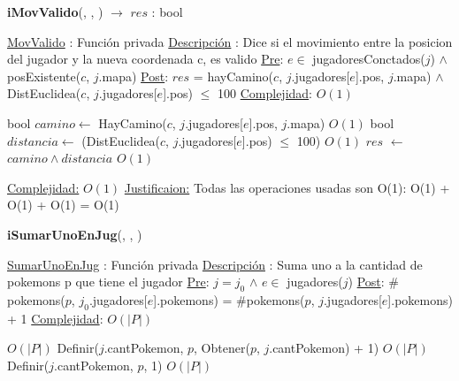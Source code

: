 \begin{Algoritmos}
\begin{algorithm}[H]
\begin{algorithmic}[1]
\end{algorithmic}
\end{algorithm}  
  


\begin{algorithm}[H]
{\textbf{iMovValido}(, , ) $\to$ $res$ : bool}
\begin{algorithmic}[1]

\Statex \underline{MovValido} : Funci\'on privada 
\Statex \underline{Descripci\'on} : Dice si el movimiento entre la posicion del jugador y la nueva coordenada c, es valido 
\Statex \underline{Pre}: $e \in$ jugadoresConctados($j$) $\land$ posExistente($c$, $j$.mapa) 
\Statex \underline{Post}: $res$ = hayCamino($c$, $j$.jugadores[$e$].pos, $j$.mapa) $\land$ 
\Statex $ $\hspace*{2cm} DistEuclidea($c$, $j$.jugadores[$e$].pos) $\leq$ 100
\Statex \underline{Complejidad}: $O(1)$ 

\State bool $camino \gets$ HayCamino($c$, $j$.jugadores[$e$].pos, $j$.mapa) \Comment $O(1)$
\State bool $distancia \gets$ (DistEuclidea($c$, $j$.jugadores[$e$].pos) $\leq$ 100) \Comment $O(1)$
\State $res$ $\gets$ $camino \land distancia$ \Comment $O(1)$

\medskip
\Statex \underline{Complejidad:} $O(1)$
\Statex \underline{Justificaion:} Todas las operaciones usadas son O(1): O(1) + O(1) + O(1) = O(1)

\end{algorithmic}
\end{algorithm}  
  


\begin{algorithm}[H]
{\textbf{iSumarUnoEnJug}(, , )}
\begin{algorithmic}[1]

\Statex \underline{SumarUnoEnJug} : Funci\'on privada 
\Statex \underline{Descripci\'on} : Suma uno a la cantidad de pokemons p que tiene el jugador 
\Statex \underline{Pre}: $j = j_0$ $\land$  $e \in$ jugadores($j$)
\Statex \underline{Post}: $\#$pokemons($p$, $j_0$.jugadores[$e$].pokemons) = $\#$pokemons($p$, $j$.jugadores[$e$].pokemons) + 1
\Statex \underline{Complejidad}: $O(|P|)$ 

 \Comment $O(|P|)$
  \State Definir($j$.cantPokemon, $p$, Obtener($p$, $j$.cantPokemon) + 1) \Comment $O(|P|)$
\Else
  \State Definir($j$.cantPokemon, $p$, 1)  \Comment $O(|P|)$
\EndIf



\end{algorithmic}
\end{algorithm}
\end{Algoritmos}
